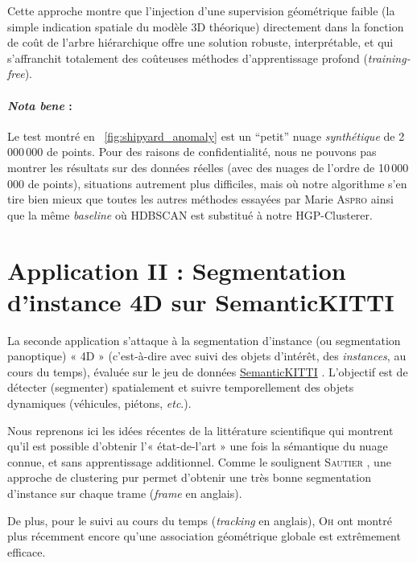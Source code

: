 Cette approche montre que l'injection d'une supervision géométrique faible (la simple indication spatiale du modèle 3D théorique) directement dans la fonction de coût de l'arbre hiérarchique offre une solution robuste, interprétable, et qui s'affranchit totalement des coûteuses méthodes d'apprentissage profond (\emph{training-free}).

\paragraph{\emph{Nota bene} :} Le test montré en \Fig~\ref{fig:shipyard_anomaly} est un ``petit'' nuage \emph{synthétique} de 2\,000\,000 de points. Pour des raisons de confidentialité, nous ne pouvons pas montrer les résultats sur des données réelles (avec des nuages de l'ordre de 10\,000\,000 de points), situations autrement plus difficiles, mais où notre algorithme s'en tire bien mieux que toutes les autres méthodes essayées par Marie \textsc{Aspro} ainsi que la même \emph{baseline} où HDBSCAN est substitué à notre HGP-Clusterer.


\section{Application II : {Segmentation d'instance 4D} sur SemanticKITTI}

La seconde application s'attaque à la segmentation d'instance (ou segmentation panoptique) « 4D » (c'est-à-dire avec suivi des objets d'intérêt, des \emph{instances}, au cours du temps), évaluée sur le jeu de données \href{https://semantic-kitti.org/}{SemanticKITTI} \cite{SemanticKITTI}. L'objectif est de détecter (segmenter) spatialement et suivre temporellement des objets dynamiques (véhicules, piétons, \emph{etc}.).

Nous reprenons ici les idées récentes de la littérature scientifique qui montrent qu'il est possible d'obtenir l'« état-de-l'art » une fois la sémantique du nuage connue, et sans apprentissage additionnel. Comme le soulignent \textsc{Sautier} \etal \cite{Sautier2025}, une approche de clustering pur permet d'obtenir une très bonne segmentation d'instance sur chaque trame (\emph{frame} en anglais). 

De plus, pour le suivi au cours du temps (\emph{tracking} en anglais), \textsc{Oh} \etal \cite{Oh2025} ont montré plus récemment encore qu'une association géométrique globale est extrêmement efficace.

